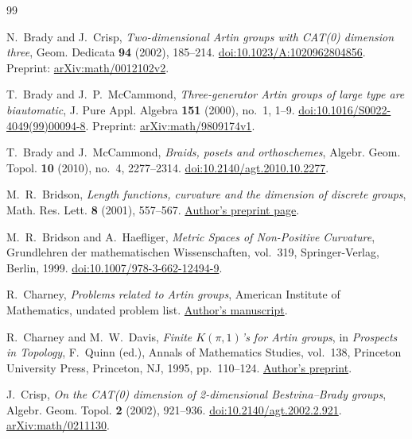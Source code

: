 \begin{thebibliography}{99}

N.~Brady and J.~Crisp,
\emph{Two-dimensional Artin groups with CAT(0) dimension three},
Geom. Dedicata \textbf{94} (2002), 185--214.
\href{https://doi.org/10.1023/A:1020962804856}{doi:10.1023/A:1020962804856}.
Preprint:
\href{https://arxiv.org/abs/math/0012102v2}{arXiv:math/0012102v2}.

T.~Brady and J.~P.~McCammond,
\emph{Three-generator Artin groups of large type are biautomatic},
J. Pure Appl. Algebra \textbf{151} (2000), no.~1, 1--9.
\href{https://doi.org/10.1016/S0022-4049(99)00094-8}{doi:10.1016/S0022-4049(99)00094-8}.
Preprint:
\href{https://arxiv.org/abs/math/9809174v1}{arXiv:math/9809174v1}.

T.~Brady and J.~McCammond,
\emph{Braids, posets and orthoschemes},
Algebr. Geom. Topol. \textbf{10} (2010), no.~4, 2277--2314.
\href{https://doi.org/10.2140/agt.2010.10.2277}{doi:10.2140/agt.2010.10.2277}.

M.~R.~Bridson,
\emph{Length functions, curvature and the dimension of discrete groups},
Math. Res. Lett. \textbf{8} (2001), 557--567.
\href{https://people.maths.ox.ac.uk/bridson/papers/dim/}{Author's preprint page}.

M.~R.~Bridson and A.~Haefliger,
\emph{Metric Spaces of Non-Positive Curvature},
Grundlehren der mathematischen Wissenschaften, vol.~319,
Springer-Verlag, Berlin, 1999.
\href{https://doi.org/10.1007/978-3-662-12494-9}{doi:10.1007/978-3-662-12494-9}.

R.~Charney,
\emph{Problems related to Artin groups},
American Institute of Mathematics, undated problem list.
\href{https://people.brandeis.edu/~charney/papers/Artin_probs.pdf}{Author's manuscript}.

R.~Charney and M.~W.~Davis,
\emph{Finite $K(\pi,1)$'s for Artin groups},
in \emph{Prospects in Topology}, F.~Quinn (ed.),
Annals of Mathematics Studies, vol.~138,
Princeton University Press, Princeton, NJ, 1995, pp.~110--124.
\href{https://people.math.osu.edu/davis.12/finitekpi1.pdf}{Author's preprint}.

J.~Crisp,
\emph{On the CAT(0) dimension of 2-dimensional Bestvina--Brady groups},
Algebr. Geom. Topol. \textbf{2} (2002), 921--936.
\href{https://doi.org/10.2140/agt.2002.2.921}{doi:10.2140/agt.2002.2.921}.
\href{https://arxiv.org/abs/math/0211130}{arXiv:math/0211130}.


\end{thebibliography}
